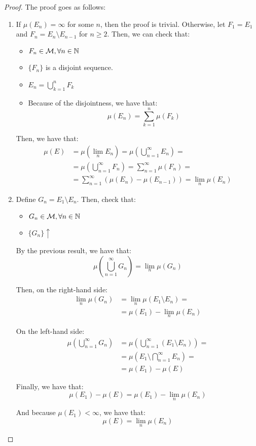 \begin{proof}
The proof goes as follows:
\begin{enumerate}[label=(\roman*)]
    \item If $\mu(E_n) = \infty$ for some $n$, then the proof is trivial. 
    Otherwise, let $F_1 = E_1$ and $F_n = E_n \setminus E_{n-1}$ for $n \geq 2$.
    Then, we can check that:
    \begin{itemize}
        \item $F_n \in \mathcal{M}, \forall n \in \mathbb{N}$
        \item $\{F_n\}$ is a disjoint sequence.
        \item $E_n = \bigcup_{k=1}^{n} F_k$
        \item Because of the disjointness, we have that:
        $$\mu(E_n) = \sum_{k=1}^{n} \mu(F_k)$$
    \end{itemize}
    Then, we have that:
    \begin{align*}
    \mu(E) &= \mu\left(\lim_{n} E_n\right) = \mu \left( \bigcup_{n = 1}^{\infty} E_n \right) =\\
    &= \mu \left( \bigcup_{n = 1}^{\infty} F_n \right) = \sum_{n=1}^{\infty} \mu(F_n) =\\
    &=\sum_{n=1}^{\infty} \left( \mu(E_n) - \mu(E_{n-1}) \right) = \lim_{n} \mu(E_n)
    \end{align*}

    \item Define $G_n = E_1 \setminus E_n$. Then, check that:
    \begin{itemize}
        \item $G_n \in \mathcal{M}, \forall n \in \mathbb{N}$
        \item $\{G_n\} \uparrow$
    \end{itemize}

    By the previous result, we have that:
    $$\mu \left( \bigcup_{n=1}^{\infty} G_n \right) = \lim_{n} \mu(G_n)$$

    Then, on the right-hand side:
    \begin{align*}
        \lim_{n} \mu(G_n) &= \lim_{n} \mu(E_1 \setminus E_n) =\\
        &=\mu(E_1) - \lim_{n} \mu(E_n)
    \end{align*}

    On the left-hand side:
    \begin{align*}
        \mu \left( \bigcup_{n=1}^{\infty} G_n \right) &= \mu\left( \bigcup_{n=1}^{\infty} (E_1 \setminus E_n) \right) =\\
        &=\mu\left( E_1 \setminus \bigcap_{n=1}^{\infty} E_n \right) =\\
        &=\mu(E_1) - \mu(E)
    \end{align*}

    Finally, we have that:
    $$\mu(E_1) - \mu(E) = \mu(E_1) - \lim_{n} \mu(E_n)$$
    
    And because $\mu(E_1) < \infty$, we have that:
    $$\mu(E) = \lim_{n} \mu(E_n)$$
\end{enumerate}
\end{proof}

